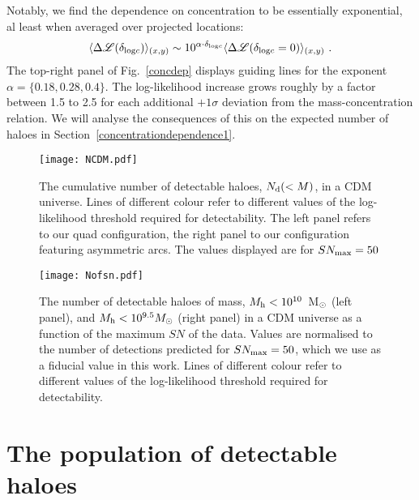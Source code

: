 \documentclass[a4paper, fleqn, usenatbib, useAMS]{mnras}
\def\DL{\Delta\mathscr{L}}
\begin{document}
 Notably, we find the dependence on concentration to be essentially exponential, al least when averaged 
 over projected locations:
 \begin{equation}
\langle\DL(\delta_{{\rm log}c})\rangle_{(x,y)} \sim 10^{\alpha\cdot \delta_{{\rm log}c}}\langle\DL(\delta_{{\rm log}c}=0)\rangle_{(x,y)} \ .
\label{concexp}
\end{equation}
%
The top-right panel of Fig.~\ref{concdep} displays guiding lines for the exponent $\alpha=\{0.18,0.28,0.4\}$. 
The log-likelihood increase grows roughly by a factor between 1.5 to 2.5 for each additional $+1\sigma$ 
deviation from the mass-concentration relation. We will analyse the consequences of this on the 
expected number of haloes in Section~\ref{concentrationdependence1}.


\begin{figure}
\centering
\texttt{[image: NCDM.pdf]}
\caption{The cumulative number of detectable haloes, $N_{\rm d}(<M)$, in a CDM universe. Lines of different colour refer to different
values of the log-likelihood threshold required for detectability.
The left panel refers to our quad configuration, the right panel 
to our configuration featuring asymmetric arcs.  The values displayed 
 are for 
$SN_{\rm max}=50$}
\label{NCDM}
\end{figure}

\begin{figure*}
\centering
\texttt{[image: Nofsn.pdf]}
\caption{The number of detectable haloes of mass, $M_{\rm h}<10^{10}$~M$_{\rm \odot}$
(left panel), and $M_{\rm h}<10^{9.5}M_{\rm \odot}$ (right panel) in a CDM universe as 
a function of the maximum $SN$ of the data. Values are normalised to the number of
detections predicted for $SN_{\rm max}=50$, which we use as a fiducial value in this work. Lines of different colour refer to different
values of the log-likelihood threshold required for detectability.}
\label{Nofsn}
\end{figure*}

\section{The population of detectable haloes}
\end{document}
